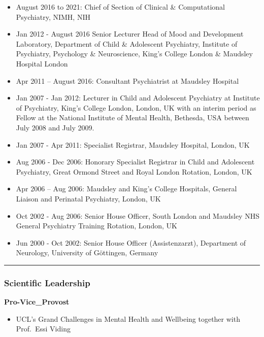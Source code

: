 \documentclass[
]{article}
\providecommand{\tightlist}{%
  \setlength{\itemsep}{0pt}\setlength{\parskip}{0pt}}
\begin{document}
\begin{itemize}
\tightlist
\item
  August 2016 to 2021: Chief of Section of Clinical \& Computational
  Psychiatry, NIMH, NIH
\item
  Jan 2012 - August 2016 Senior Lecturer Head of Mood and Development
  Laboratory, Department of Child \& Adolescent Psychiatry, Institute of
  Psychiatry, Psychology \& Neuroscience, King's College London \&
  Maudsley Hospital London
\item
  Apr 2011 -- August 2016: Consultant Psychiatrist at Maudsley Hospital
\item
  Jan 2007 - Jan 2012: Lecturer in Child and Adolescent Psychiatry at
  Institute of Psychiatry, King's College London, London, UK with an
  interim period as Fellow at the National Institute of Mental Health,
  Bethesda, USA between July 2008 and July 2009.
\item
  Jan 2007 - Apr 2011: Specialist Registrar, Maudsley Hospital, London,
  UK
\item
  Aug 2006 - Dec 2006: Honorary Specialist Registrar in Child and
  Adolescent Psychiatry, Great Ormond Street and Royal London Rotation,
  London, UK
\item
  Apr 2006 -- Aug 2006: Maudsley and King's College Hospitals, General
  Liaison and Perinatal Psychiatry, London, UK
\item
  Oct 2002 - Aug 2006: Senior House Officer, South London and Maudsley
  NHS General Psychiatry Training Rotation, London, UK
\item
  Jun 2000 - Oct 2002: Senior House Officer (Assistenzarzt), Department
  of Neurology, University of Göttingen, Germany
\end{itemize}

\begin{center}\rule{0.5\linewidth}{0.5pt}\end{center}

\hypertarget{scientific-leadership}{%
\subsubsection{Scientific Leadership}\label{scientific-leadership}}

\textbf{Pro-Vice\_Provost}

\begin{itemize}
\tightlist
\item
  UCL's Grand Challenges in Mental Health and Wellbeing together with
  Prof.~Essi Viding
\end{itemize}
\end{document}
